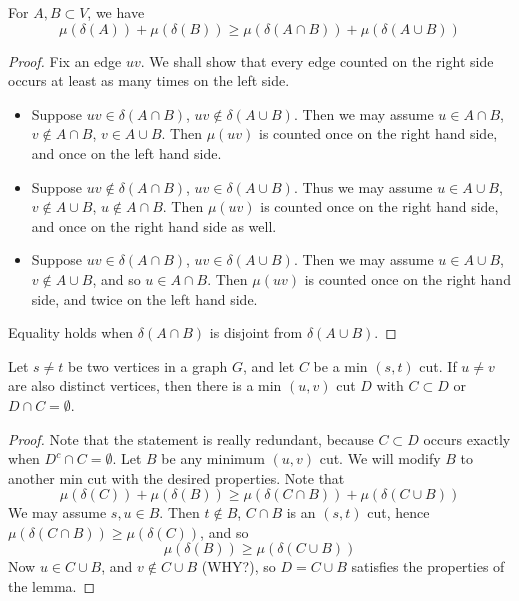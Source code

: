 \begin{theorem}
    For $A,B \subset V$, we have
    \[ \mu(\delta(A)) + \mu(\delta(B)) \geq \mu(\delta(A \cap B)) + \mu(\delta(A \cup B)) \]
\end{theorem}
\begin{proof}
    Fix an edge $uv$. We shall show that every edge counted on the right side occurs at least as many times on the left side.
    \begin{itemize}
        \item Suppose $uv \in \delta(A \cap B)$, $uv \not \in \delta(A \cup B)$. Then we may assume $u \in A \cap B$, $v \not \in A \cap B$, $v \in A \cup B$. Then $\mu(uv)$ is counted once on the right hand side, and once on the left hand side.
        \item Suppose $uv \not \in \delta(A \cap B)$, $uv \in \delta(A \cup B)$. Thus we may assume $u \in A \cup B$, $v \not \in A \cup B$, $u \not \in A \cap B$. Then $\mu(uv)$ is counted once on the right hand side, and once on the right hand side as well.
        \item Suppose $uv \in \delta(A \cap B)$, $uv \in \delta(A \cup B)$. Then we may assume $u \in A \cup B$, $v \not \in A \cup B$, and so $u \in A \cap B$. Then $\mu(uv)$ is counted once on the right hand side, and twice on the left hand side.
    \end{itemize}
    Equality holds when $\delta(A \cap B)$ is disjoint from $\delta(A \cup B)$.
\end{proof}

\begin{lemma}
    Let $s \neq t$ be two vertices in a graph $G$, and let $C$ be a min $(s,t)$ cut. If $u \neq v$ are also distinct vertices, then there is a min $(u,v)$ cut $D$ with $C \subset D$ or $D \cap C = \emptyset$.
\end{lemma}
\begin{proof}
    Note that the statement is really redundant, because $C \subset D$ occurs exactly when $D^c \cap C = \emptyset$. Let $B$ be any minimum $(u,v)$ cut. We will modify $B$ to another min cut with the desired properties. Note that
    \[ \mu(\delta(C)) + \mu(\delta(B)) \geq \mu(\delta(C \cap B)) + \mu(\delta(C \cup B)) \]
    We may assume $s,u \in B$. Then $t \not \in B$, $C \cap B$ is an $(s,t)$ cut, hence $\mu(\delta(C \cap B)) \geq \mu(\delta(C))$, and so
    \[ \mu(\delta(B)) \geq \mu(\delta(C \cup B)) \]
    Now $u \in C \cup B$, and $v \not \in C \cup B$ (WHY?), so $D = C \cup B$ satisfies the properties of the lemma.
\end{proof}

